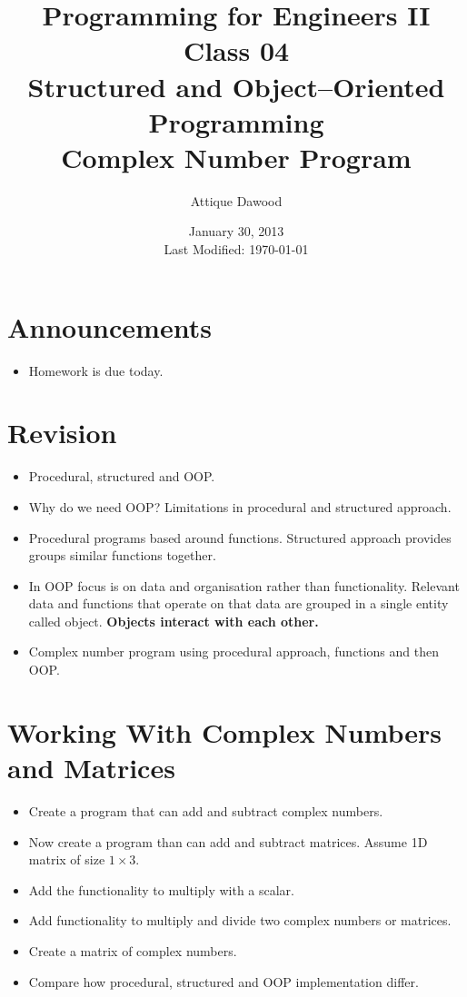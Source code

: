 \documentclass[12pt,a4paper]{article}
\title{\vspace{-2cm}Programming for Engineers II\\Class 04\\Structured and Object--Oriented Programming\\Complex Number Program}
\author{Attique Dawood}
\date{January 30, 2013\\[0.2cm] Last Modified: \today}
\begin{document}
\maketitle
\section{Announcements}
\begin{itemize}
\item Homework is due today.
\end{itemize}
\section{Revision}
\begin{itemize}
\item Procedural, structured and OOP.
\item Why do we need OOP? Limitations in procedural and structured approach.
\item Procedural programs based around functions. Structured approach provides groups similar functions together.
\item In OOP focus is on data and organisation rather than functionality. Relevant data and functions that operate on that data are grouped in a single entity called object. \textbf{Objects interact with each other.}
\item Complex number program using procedural approach, functions and then OOP.
\end{itemize}
\section{Working With Complex Numbers and Matrices}
\begin{itemize}
\item Create a program that can add and subtract complex numbers.
\item Now create a program than can add and subtract matrices. Assume 1D matrix of size $1\times 3$.
\item Add the functionality to multiply with a scalar.
\item Add functionality to multiply and divide two complex numbers or matrices.
\item Create a matrix of complex numbers.
\item Compare how procedural, structured and OOP implementation differ.
\end{itemize}
\end{document}
